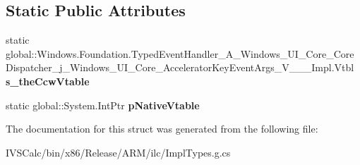 \subsection*{Static Public Attributes}
\begin{DoxyCompactItemize}
\item 
\mbox{\label{struct_windows_1_1_foundation_1_1_typed_event_handler___a___windows___u_i___core___core_dispatch3f137e4e492cef082f78b8aa53fc2fe8_a16f81f44da4232e7f852b87263424f52}} 
static global\+::\+Windows.\+Foundation.\+Typed\+Event\+Handler\+\_\+\+A\+\_\+\+Windows\+\_\+\+U\+I\+\_\+\+Core\+\_\+\+Core\+Dispatcher\+\_\+j\+\_\+\+Windows\+\_\+\+U\+I\+\_\+\+Core\+\_\+\+Accelerator\+Key\+Event\+Args\+\_\+\+V\+\_\+\+\_\+\+\_\+\+Impl.\+Vtbl {\bfseries s\+\_\+the\+Ccw\+Vtable}
\item 
\mbox{\label{struct_windows_1_1_foundation_1_1_typed_event_handler___a___windows___u_i___core___core_dispatch3f137e4e492cef082f78b8aa53fc2fe8_a7453743620f111bad33172d1a23b369e}} 
static global\+::\+System.\+Int\+Ptr {\bfseries p\+Native\+Vtable}
\end{DoxyCompactItemize}


The documentation for this struct was generated from the following file\+:\begin{DoxyCompactItemize}
\item 
I\+V\+S\+Calc/bin/x86/\+Release/\+A\+R\+M/ilc/Impl\+Types.\+g.\+cs\end{DoxyCompactItemize}
